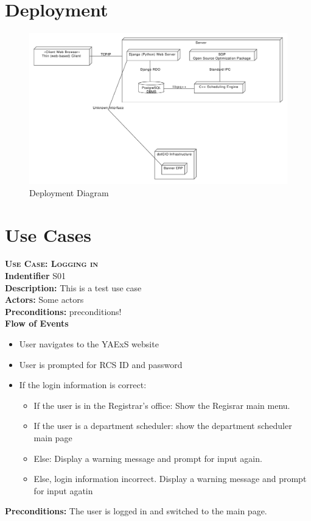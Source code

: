\documentclass[11pt]{article}
\newenvironment{usecase}{%
	\def\title##1{ {\large \bfseries  \scshape {Use Case:} ##1} \\ }
 	\def\id##1{{\bf Indentifier} ##1\\}
	\def\des##1{ {\bf Description:} ##1\\}
	\def\actors##1{ {\bf Actors:} ##1\\}
    	\def\pre##1{ {\bf Preconditions:} ##1 \\} %
    	\def\flow##1{ {\bf Flow of Events} ##1}%
    	\renewenvironment{enumerate}{%
        	\begin{itemize}[nolistsep]\small}%
        	{\end{itemize}}
	\def\post##1{ {\bf Preconditions:} ##1 \\}
}{\vspace{.05in}}
\begin{document}
\section{Deployment}


\begin{figure}[ht]
	\centering
		\includegraphics[width = \textwidth]{deploymentdiagram.pdf}
	\caption{Deployment Diagram}
	\label{fig:Deploy}
\end{figure}


\section{Use Cases}


        \begin{usecase}
	\title{Logging in}
	  \id{S01}
	\des{This is a test use case}
	\actors{Some actors}
	\pre{preconditions!}
	\flow{}
            \begin{enumerate}
                \item User navigates to the YAExS website
                \item User is prompted for RCS ID and password
		\item If the login information is correct:
			\begin{itemize}
				\item If the user is in the Registrar's office: Show the Regisrar main menu.
				\item If the user is a department scheduler: show the department scheduler main page
				\item Else: Display a warning message and prompt for input again.
		\item Else, login information incorrect. Display a warning message and prompt for input agatin
			\end{itemize}
            \end{enumerate}
	\post{The user is logged in and switched to the main page.}
        \end{usecase}
\end{document}
